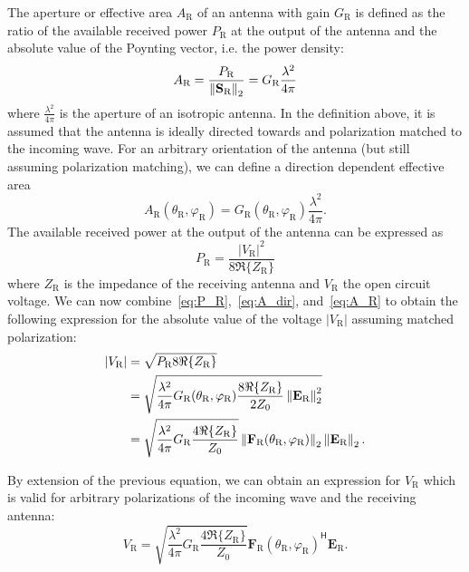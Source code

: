 The aperture or effective area $A_\text{R}$ of an antenna with gain $G_\text{R}$ is defined as the ratio of the available received power $P_\text{R}$ at the output of the antenna and the absolute value of the Poynting vector, i.e. the power density:
\begin{equation}
    \label{eq:A_R}
    A_\text{R} = \frac{P_\text{R}}{\left\lVert\mathbf{S}_\text{R}\right\rVert_2} = G_\text{R}\frac{\lambda^2}{4\pi}
\end{equation}
where $\frac{\lambda^2}{4\pi}$ is the aperture of an isotropic antenna. In the definition above, it is assumed that the antenna is ideally directed towards and polarization matched to the incoming wave.
For an arbitrary orientation of the antenna (but still assuming polarization matching), we can define a direction dependent effective area
\begin{equation}
    \label{eq:A_dir}
    A_\text{R}(\theta_\text{R}, \varphi_\text{R}) = G_\text{R}(\theta_\text{R}, \varphi_\text{R})\frac{\lambda^2}{4\pi}.
\end{equation}
%
The available received power at the output of the antenna can be expressed as
\begin{equation}
    \label{eq:P_R}
    P_\text{R} = \frac{|V_\text{R}|^2}{8\Re\{Z_\text{R}\}}
\end{equation}
where $Z_\text{R}$ is the impedance of the receiving antenna and $V_\text{R}$ the open circuit voltage.
%
We can now combine~\eqref{eq:P_R},~\eqref{eq:A_dir}, and~\eqref{eq:A_R} to obtain the following expression for the absolute value of the voltage $|V_\text{R}|$ assuming matched polarization:
\begin{align}
    |V_\text{R}| &= \sqrt{P_\text{R} 8\Re\{Z_\text{R}\}}\\
                    &= \sqrt{\frac{\lambda^2}{4\pi} G_\text{R}(\theta_\text{R}, \varphi_\text{R}) \frac{8\Re\{Z_\text{R}\}}{2 Z_0} \left\lVert\mathbf{E}_\text{R}\right\rVert_2^2}\\
                    &= \sqrt{\frac{\lambda^2}{4\pi} G_\text{R} \frac{4\Re\{Z_\text{R}\}}{Z_0}} \left\lVert\mathbf{F}_\text{R}(\theta_\text{R}, \varphi_\text{R})\right\rVert_2\left\lVert\mathbf{E}_\text{R}\right\rVert_2.
\end{align}

By extension of the previous equation, we can obtain an expression for $V_\text{R}$ which is valid for arbitrary polarizations of the incoming wave and the receiving antenna:
\begin{equation}
    \label{eq:V_R}
    V_\text{R} = \sqrt{\frac{\lambda^2}{4\pi} G_\text{R} \frac{4\Re\{Z_\text{R}\}}{Z_0}} \mathbf{F}_\text{R}(\theta_\text{R}, \varphi_\text{R})^{\mathsf{H}}\mathbf{E}_\text{R}.
\end{equation}

